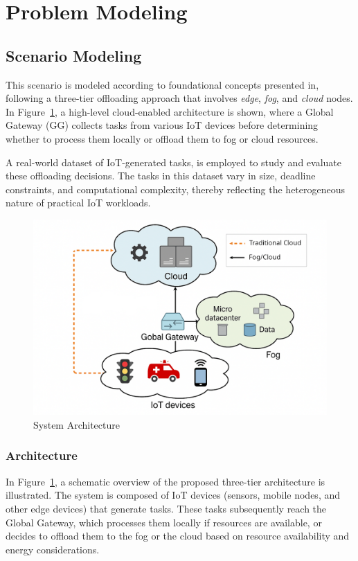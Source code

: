 \documentclass[preprint,3p,authoryear]{elsarticle}
\begin{document}
\section{Problem Modeling}\label{sec:problem_modeling}

\subsection{Scenario Modeling}\label{sec:scenario_modeling}

This scenario is modeled according to foundational concepts presented in\cite{aazam_cloud_2022, bukhari_intelligent_2022, jazayeri_autonomous_2021}, following a three-tier offloading approach that involves \textit{edge}, \textit{fog}, and \textit{cloud} nodes. In Figure~\ref{fig:cloud-architecture}, a high-level cloud-enabled architecture is shown, where a Global Gateway (GG) collects tasks from various IoT devices before determining whether to process them locally or offload them to fog or cloud resources.


A real-world dataset of IoT-generated tasks, is employed to study and evaluate these offloading decisions. The tasks in this dataset vary in size, deadline constraints, and computational complexity, thereby reflecting the heterogeneous nature of practical IoT workloads.

\begin{figure}[ht]
    \centering
    \includegraphics[width=0.75\linewidth]{figs/cloud_architecture.png}
    \caption{System Architecture}\label{fig:cloud-architecture}
\end{figure}


\subsubsection{Architecture}\label{subsec:architecture}

In Figure~\ref{fig:cloud-architecture}, a schematic overview of the proposed three-tier architecture is illustrated. The system is composed of IoT devices (sensors, mobile nodes, and other edge devices) that generate tasks. These tasks subsequently reach the Global Gateway, which processes them locally if resources are available, or decides to offload them to the fog or the cloud based on resource availability and energy considerations.
\end{document}
